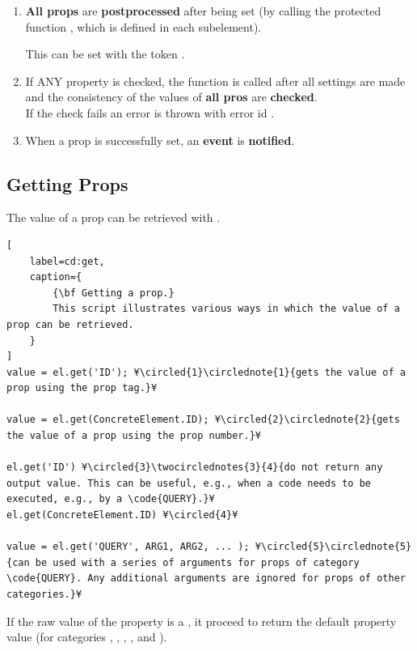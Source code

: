 \documentclass{tufte-handout}
\begin{document}
\begin{enumerate}
\item{} {\bf All props} are {\bf postprocessed} after being set (by calling the protected function , which is defined in each subelement).
	
	This can be set with the token .

\item{} If ANY property is checked, the function  is called after all settings are made and the consistency of the values of {\bf all pros} are {\bf checked}.\\
	If the check fails an error is thrown with error id .
	
\item{} When a prop is successfully set, an {\bf event}  is {\bf notified}.

\end{enumerate} 

\subsection{Getting Props}

The value of a prop can be retrieved with .

\begin{lstlisting}[
	label=cd:get,
	caption={
		{\bf Getting a prop.}
		This script illustrates various ways in which the value of a prop can be retrieved.
	}
]
value = el.get('ID'); ¥\circled{1}\circlednote{1}{gets the value of a prop using the prop tag.}¥

value = el.get(ConcreteElement.ID); ¥\circled{2}\circlednote{2}{gets the value of a prop using the prop number.}¥

el.get('ID') ¥\circled{3}\twocirclednotes{3}{4}{do not return any output value. This can be useful, e.g., when a code needs to be executed, e.g., by a \code{QUERY}.}¥
el.get(ConcreteElement.ID) ¥\circled{4}¥

value = el.get('QUERY', ARG1, ARG2, ... ); ¥\circled{5}\circlednote{5}{can be used with a series of arguments for props of category \code{QUERY}. Any additional arguments are ignored for props of other categories.}¥
\end{lstlisting}

If the raw value of the property is a , it proceed to return the default property value (for categories , , , , and ).
 
\end{document}
